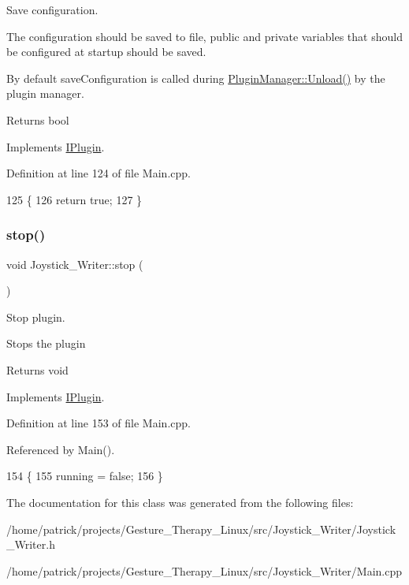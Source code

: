 Save configuration. 

The configuration should be saved to file, public and private variables that should be configured at startup should be saved.

By default save\+Configuration is called during \hyperlink{class_plugin_manager_ab651a05d6fcb92562807e9f5ecc30855}{Plugin\+Manager\+::\+Unload()} by the plugin manager.

\begin{DoxyReturn}{Returns}
bool 
\end{DoxyReturn}


Implements \hyperlink{class_i_plugin_a79b5c42b1c7b08257a6110b2091039bc}{I\+Plugin}.



Definition at line 124 of file Main.\+cpp.


\begin{DoxyCode}
125 \{
126     \textcolor{keywordflow}{return} \textcolor{keyword}{true};
127 \}
\end{DoxyCode}
\mbox{\label{class_joystick___writer_a3c606f3961eea4b6a371146479ca26da}} 
\subsubsection{\texorpdfstring{stop()}{stop()}}
{\footnotesize\ttfamily void Joystick\+\_\+\+Writer\+::stop (\begin{DoxyParamCaption}{ }\end{DoxyParamCaption})\hspace{0.3cm}{\ttfamily [virtual]}}



Stop plugin. 

Stops the plugin \begin{DoxyReturn}{Returns}
void 
\end{DoxyReturn}


Implements \hyperlink{class_i_plugin_a86e523c283aec5c9fb21249a76e916ac}{I\+Plugin}.



Definition at line 153 of file Main.\+cpp.



Referenced by Main().


\begin{DoxyCode}
154 \{
155     running = \textcolor{keyword}{false};
156 \}
\end{DoxyCode}


The documentation for this class was generated from the following files\+:\begin{DoxyCompactItemize}
\item 
/home/patrick/projects/\+Gesture\+\_\+\+Therapy\+\_\+\+Linux/src/\+Joystick\+\_\+\+Writer/Joystick\+\_\+\+Writer.\+h\item 
/home/patrick/projects/\+Gesture\+\_\+\+Therapy\+\_\+\+Linux/src/\+Joystick\+\_\+\+Writer/Main.\+cpp\end{DoxyCompactItemize}
